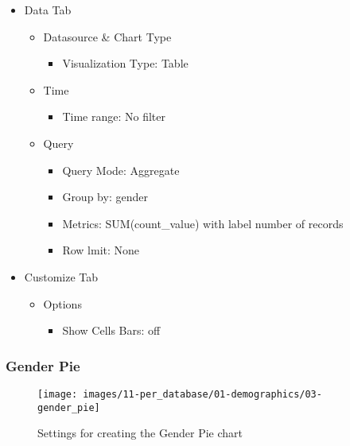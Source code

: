 \documentclass[
]{book}
\providecommand{\tightlist}{%
  \setlength{\itemsep}{0pt}\setlength{\parskip}{0pt}}
\begin{document}
\begin{itemize}
\tightlist
\item
  Data Tab

  \begin{itemize}
  \tightlist
  \item
    Datasource \& Chart Type

    \begin{itemize}
    \tightlist
    \item
      Visualization Type: Table
    \end{itemize}
  \item
    Time

    \begin{itemize}
    \tightlist
    \item
      Time range: No filter
    \end{itemize}
  \item
    Query

    \begin{itemize}
    \tightlist
    \item
      Query Mode: Aggregate
    \item
      Group by: gender
    \item
      Metrics: SUM(count\_value) with label number of records
    \item
      Row lmit: None
    \end{itemize}
  \end{itemize}
\item
  Customize Tab

  \begin{itemize}
  \tightlist
  \item
    Options

    \begin{itemize}
    \tightlist
    \item
      Show Cells Bars: off
    \end{itemize}
  \end{itemize}
\end{itemize}

\hypertarget{gender-pie}{%
\subsubsection*{Gender Pie}\label{gender-pie}}

\begin{figure}
\texttt{[image: images/11-per\_database/01-demographics/03-gender\_pie]} \caption{Settings for creating the Gender Pie chart}\label{fig:genderPie}
\end{figure}
\end{document}
